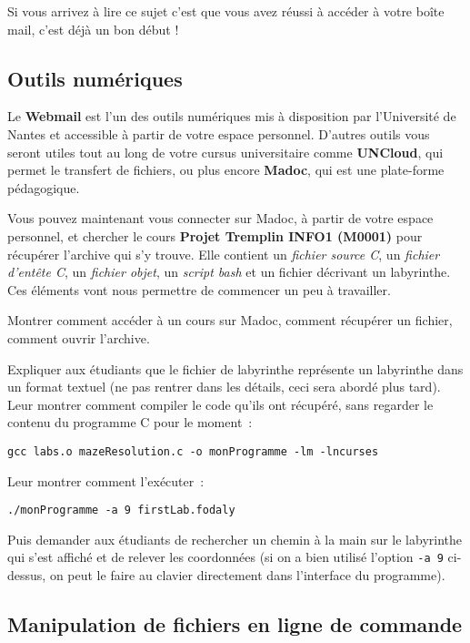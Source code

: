 \documentclass[a4paper]{article}
\newenvironment{enseignants}[1]{\noindent\color{blue}{\bf #1}}{}
\begin{document}
Si vous arrivez à lire ce sujet c’est que vous avez réussi à accéder à votre boîte mail, c’est déjà un bon début !

\subsection{Outils numériques}

Le \textbf{Webmail} est l’un des outils numériques mis à disposition par l’Université de Nantes et accessible à partir de votre espace personnel. D’autres outils vous seront utiles tout au long de votre cursus universitaire comme \textbf{UNCloud}, qui permet le transfert de fichiers, ou plus encore \textbf{Madoc}, qui est une plate-forme pédagogique.

Vous pouvez maintenant vous connecter sur Madoc, à partir de votre espace personnel, et chercher le cours \textbf{Projet Tremplin INFO1 (M0001)} pour récupérer l'archive qui s'y trouve. Elle contient un \emph{fichier source C}, un \emph{fichier d'entête C}, un \emph{fichier objet}, un \emph{script bash} et un fichier décrivant un labyrinthe. Ces éléments vont nous permettre de commencer un peu à travailler.

\begin{enseignants}{Madoc~:}
  Montrer comment accéder à un cours sur Madoc, comment récupérer un fichier, comment ouvrir l'archive.
\end{enseignants}

\begin{enseignants}{}
  Expliquer aux étudiants que le fichier de labyrinthe représente un labyrinthe dans un format textuel (ne pas rentrer dans les détails, ceci sera abordé plus tard).
  Leur montrer comment compiler le code qu'ils ont récupéré, sans regarder le contenu du programme C pour le moment~:

  \verb|gcc labs.o mazeResolution.c -o monProgramme -lm -lncurses|

  Leur montrer comment l'exécuter~:

  \verb|./monProgramme -a 9 firstLab.fodaly|

  Puis demander aux étudiants de rechercher un chemin à la main sur le labyrinthe qui s'est affiché et de relever les coordonnées (si on a bien utilisé l'option \verb|-a 9| ci-dessus, on peut le faire au clavier directement dans l'interface du programme).
\end{enseignants}

\subsection{Manipulation de fichiers en ligne de commande}
\end{document}
